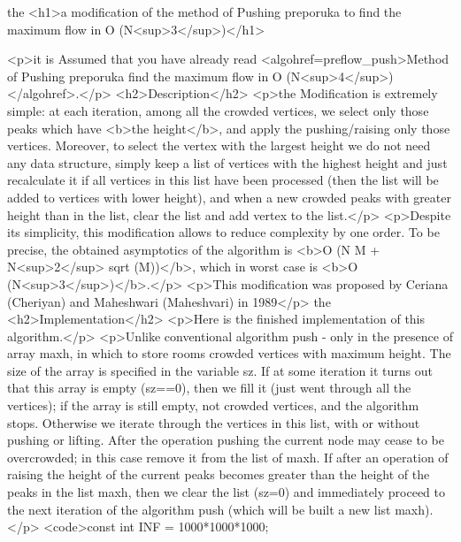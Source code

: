 the <h1>a modification of the method of Pushing preporuka to find the maximum flow in O (N<sup>3</sup>)</h1>

<p>it is Assumed that you have already read <algohref=preflow_push>Method of Pushing preporuka find the maximum flow in O (N<sup>4</sup>)</algohref>.</p>
<h2>Description</h2>
<p>the Modification is extremely simple: at each iteration, among all the crowded vertices, we select only those peaks which have <b>the height</b>, and apply the pushing/raising only those vertices. Moreover, to select the vertex with the largest height we do not need any data structure, simply keep a list of vertices with the highest height and just recalculate it if all vertices in this list have been processed (then the list will be added to vertices with lower height), and when a new crowded peaks with greater height than in the list, clear the list and add vertex to the list.</p>
<p>Despite its simplicity, this modification allows to reduce complexity by one order. To be precise, the obtained asymptotics of the algorithm is <b>O (N M + N<sup>2</sup> sqrt (M))</b>, which in worst case is <b>O (N<sup>3</sup>)</b>.</p>
<p>This modification was proposed by Ceriana (Cheriyan) and Maheshwari (Maheshvari) in 1989</p>
the <h2>Implementation</h2>
<p>Here is the finished implementation of this algorithm.</p>
<p>Unlike conventional algorithm push - only in the presence of array maxh, in which to store rooms crowded vertices with maximum height. The size of the array is specified in the variable sz. If at some iteration it turns out that this array is empty (sz==0), then we fill it (just went through all the vertices); if the array is still empty, not crowded vertices, and the algorithm stops. Otherwise we iterate through the vertices in this list, with or without pushing or lifting. After the operation pushing the current node may cease to be overcrowded; in this case remove it from the list of maxh. If after an operation of raising the height of the current peaks becomes greater than the height of the peaks in the list maxh, then we clear the list (sz=0) and immediately proceed to the next iteration of the algorithm push (which will be built a new list maxh).</p>
<code>const int INF = 1000*1000*1000;

